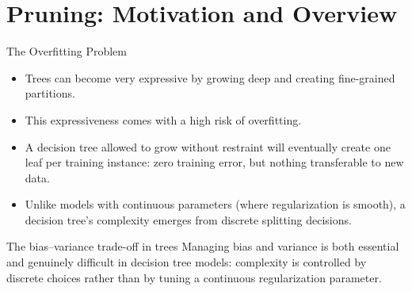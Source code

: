 \section{Pruning: Motivation and Overview}

\begin{frame}{The Overfitting Problem}
  \begin{itemize}
    \item Trees can become very expressive by growing deep and creating fine-grained partitions.
    \item This expressiveness comes with a high risk of \alert{overfitting}.
    \item A decision tree allowed to grow without restraint will eventually create \alert{one leaf
          per training instance}: zero training error, but nothing transferable to new data.
    \item Unlike models with continuous parameters (where regularization is smooth), a
          decision tree's complexity emerges from \alert{discrete splitting decisions}.
  \end{itemize}
  \begin{alertblock}{The bias--variance trade-off in trees}
    Managing bias and variance is both \alert{essential} and \alert{genuinely difficult} in
    decision tree models: complexity is controlled by discrete choices rather than by tuning
    a continuous regularization parameter.
  \end{alertblock}
\end{frame}

